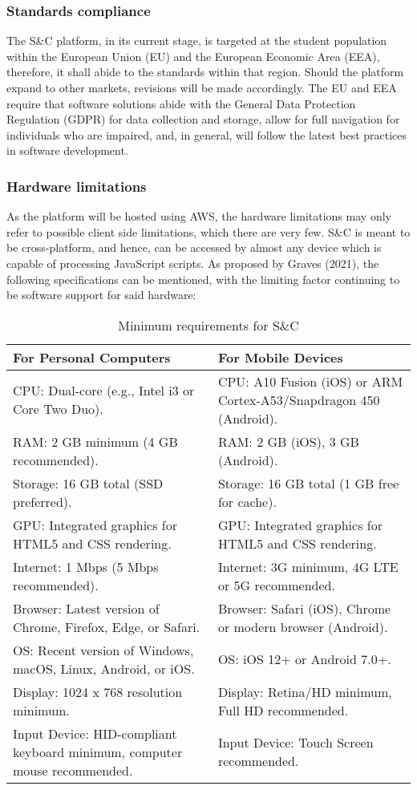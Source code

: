 \subsubsection{Standards compliance}
The S\&C platform, in its current stage, is targeted at the student population within the European Union (EU) and the European Economic Area (EEA), therefore, it shall abide to the standards within that region. Should the platform expand to other markets, revisions will be made accordingly.
The EU and EEA require that software solutions abide with the General Data Protection Regulation (GDPR) for data collection and storage, allow for full navigation for individuals who are impaired, and, in general, will follow the latest best practices in software development.
\subsubsection{Hardware limitations}
As the platform will be hosted using AWS, the hardware limitations may only refer to possible client side limitations, which there are very few. S\&C is meant to be cross-platform, and hence, can be accessed by almost any device which is capable of processing JavaScript scripts. As proposed by Graves (2021), the following specifications can be mentioned, with the limiting factor continuing to be software support for said hardware:

\begin{table}[h!]
\centering
\begin{tabular}{|>{\raggedright\arraybackslash}p{6cm}|>{\raggedright\arraybackslash}p{6cm}|}
\hline
\textbf{For Personal Computers} & \textbf{For Mobile Devices} \\ \hline
CPU: Dual-core (e.g., Intel i3 or Core Two Duo). & CPU: A10 Fusion (iOS) or ARM Cortex-A53/Snapdragon 450 (Android). \\ \hline
RAM: 2 GB minimum (4 GB recommended). & RAM: 2 GB (iOS), 3 GB (Android). \\ \hline
Storage: 16 GB total (SSD preferred). & Storage: 16 GB total (1 GB free for cache). \\ \hline
GPU: Integrated graphics for HTML5 and CSS rendering. & GPU: Integrated graphics for HTML5 and CSS rendering. \\ \hline
Internet: 1 Mbps (5 Mbps recommended). & Internet: 3G minimum, 4G LTE or 5G recommended. \\ \hline
Browser: Latest version of Chrome, Firefox, Edge, or Safari. & Browser: Safari (iOS), Chrome or modern browser (Android). \\ \hline
OS: Recent version of Windows, macOS, Linux, Android, or iOS. & OS: iOS 12+ or Android 7.0+. \\ \hline
Display: 1024 x 768 resolution minimum. & Display: Retina/HD minimum, Full HD recommended.  \\ \hline
Input Device: HID-compliant keyboard minimum, computer mouse recommended. & Input Device: Touch Screen recommended.\\ \hline
\end{tabular}
\caption{Minimum requirements for S\&C}
\label{tab:hardware-specs}
\end{table}

